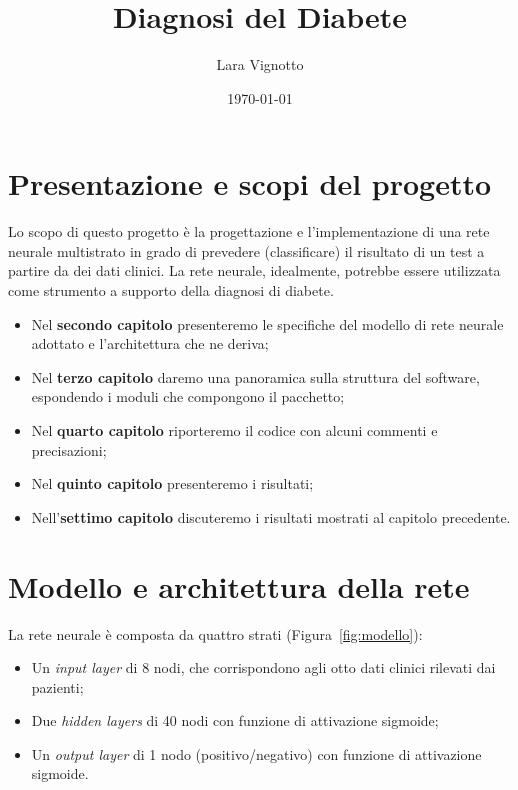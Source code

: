 \documentclass[a4paper,12pt]{article}
\title{\textbf{Diagnosi del Diabete}}
\author{Lara Vignotto}
\date{\today}
\begin{document}
\maketitle

\vfill
\tableofcontents


\newpage
\section{Presentazione e scopi del progetto} %

Lo scopo di questo progetto è la progettazione e l'implementazione di una rete neurale multistrato in grado di prevedere (classificare) il risultato di un test a partire da dei dati clinici. La rete neurale, idealmente, potrebbe essere utilizzata come strumento a supporto della diagnosi di diabete. 
\begin{itemize}
  \item Nel \textbf{secondo capitolo} presenteremo le specifiche del modello di rete neurale adottato e l'architettura che ne deriva;
  \item Nel \textbf{terzo capitolo} daremo una panoramica sulla struttura del software, espondendo i moduli che compongono il pacchetto;
  \item Nel \textbf{quarto capitolo} riporteremo il codice con alcuni commenti e precisazioni;
  \item Nel \textbf{quinto capitolo} presenteremo i risultati;
  \item Nell'\textbf{settimo capitolo} discuteremo i risultati mostrati al capitolo precedente.
\end{itemize}



\newpage
\section{Modello e architettura della rete} %

La rete neurale è composta da quattro strati (Figura~\vref{fig:modello}):
\begin{itemize}
    \item Un \emph{input layer} di 8 nodi, che corrispondono agli otto dati clinici rilevati dai pazienti;
    \item Due \emph{hidden layers} di 40 nodi con funzione di attivazione sigmoide;
    \item Un \emph{output layer} di 1 nodo (positivo/negativo) con funzione di attivazione sigmoide.
\end{itemize}
\end{document}
